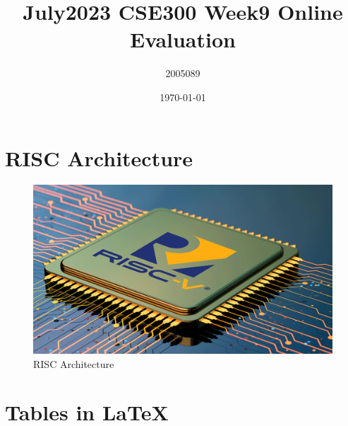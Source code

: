 \documentclass[11pt]{article}
\title{July2023 CSE300 Week9 Online Evaluation}
\author{2005089}
\date{\today}
\begin{document}
\maketitle
\tableofcontents

\pagebreak 

\section{RISC Architecture}
  \begin{figure}[h]
      \centering
      \includegraphics[scale = 0.3]{Images/risc.png}
      \caption{RISC Architecture}
      \label{fig:enter-label}
  \end{figure}

  \section{Tables in \LaTeX}
\end{document}
